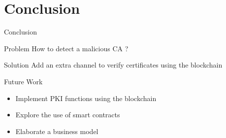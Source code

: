 \section[Conclusion]{Conclusion}
\begin{frame}{Conclusion}

\begin{alertblock}{Problem}
	How to detect a malicious CA ?
\end{alertblock}

\begin{exampleblock}{Solution}
	Add an extra channel to verify certificates using the blockchain
\end{exampleblock}

\end{frame}

\begin{frame}{Future Work}

\begin{itemize}

\item Implement PKI functions using the blockchain

\item Explore the use of smart contracts

\item Elaborate a business model

\end{itemize}

\end{frame}
